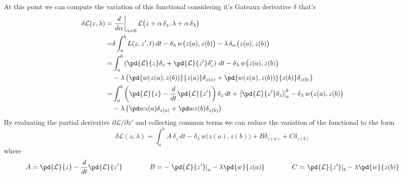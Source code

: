 At this point we can compute the variation of this functional considering it's Gateaux derivative $\delta$ that's
\begin{align*}
	\delta \mathcal L  (z,\lambda)  =& \left.\frac{d}{d\alpha}\right|_{\alpha = 0} \mathcal L  \big(z + \alpha\, \delta_z, \lambda + \alpha\, \delta_\lambda\big) \\
	=& \delta \int_a^b L (z,z',t)\, dt - \delta_\lambda\,w\big(z(a),z(b)\big) - \lambda \, \delta_w\big(z(a),z(b)\big) \\
	=& \int_a^b \left( \pd{\mathcal L  }{z}\delta_z + \pd{\mathcal L  }{z'} \delta_z' \right) \, dt - \delta_\lambda\,w\big(z(a),z(b)\big)  \\ & - \lambda \left( \pd{w(z(a),z(b))}{z(a)} \delta_{z(a)} + \pd{w(z(a),z(b))}{z(b)} \delta_{z(b)} \right) \\
	= & \int_a^b \left( \pd{\mathcal L  }{z} - \frac{d}{dt} \pd{\mathcal L  }{z'} \right)\delta_z\, dt + \left.\left[ \pd{\mathcal L  }{z'}\delta_z \right]\right|_a^b - \delta_\lambda\,w\big(z(a),z(b)\big) \\ & - \lambda\left( \pd w {z(a)} \delta_{z(a)} + \pd w {z(b)} \delta_{z(b)}  \right)
\end{align*}
By evaluating the partial derivative $\partial \mathcal L  /\partial z'$ and collecting common terms we can reduce the variation of the functional to the form
\[ \delta \mathcal L  (z,\lambda) = \int_a^b A\,\delta_z\, dt - \delta_\lambda\, w\big(z(a),z(b)\big) + B \delta_{z(a)} + C \delta_{z(b)} \]
where
\[ A = \pd{\mathcal L  }{z} - \frac{d}{dt} \pd{\mathcal L  }{z'} \qquad \qquad B = - \left.\pd{\mathcal L  }{z'} \right|_a - \lambda \pd{w}{z(a)} \qquad \qquad C = \left.\pd{\mathcal L  }{z'} \right|_b - \lambda \pd{w}{z(b)}    \]


